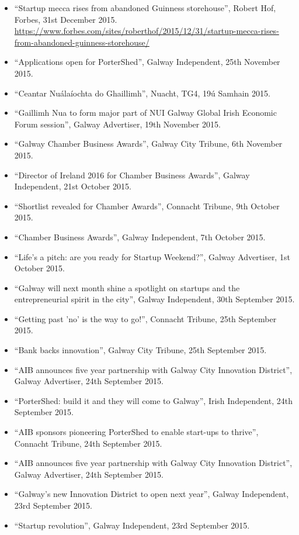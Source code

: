 \documentclass[10pt,a4paper]{res} %
\begin{document}
\begin{resume}
{\begin{itemize}
\item ``Startup mecca rises from abandoned Guinness storehouse'', Robert Hof, Forbes, 31st December 2015. \url{https://www.forbes.com/sites/roberthof/2015/12/31/startup-mecca-rises-from-abandoned-guinness-storehouse/}
\item ``Applications open for PorterShed'', Galway Independent, 25th November 2015.
\item ``Ceantar Nu\'{a}la\'{i}ochta do Ghaillimh'', Nuacht, TG4, 19\'{u} Samhain 2015.
\item ``Gaillimh Nua to form major part of NUI Galway Global Irish Economic Forum session'', Galway Advertiser, 19th November 2015.
\item ``Galway Chamber Business Awards'', Galway City Tribune, 6th November 2015.
\item ``Director of Ireland 2016 for Chamber Business Awards'', Galway Independent, 21st October 2015.
\item ``Shortlist revealed for Chamber Awards'', Connacht Tribune, 9th October 2015.
\item ``Chamber Business Awards'', Galway Independent, 7th October 2015.
\item ``Life's a pitch: are you ready for Startup Weekend?'', Galway Advertiser, 1st October 2015.
\item ``Galway will next month shine a spotlight on startups and the entrepreneurial spirit in the city'', Galway Independent, 30th September 2015.
\item ``Getting past 'no' is the way to go!'', Connacht Tribune, 25th September 2015.
\item ``Bank backs innovation'', Galway City Tribune, 25th September 2015.
\item ``AIB announces five year partnership with Galway City Innovation District'', Galway Advertiser, 24th September 2015.
\item ``PorterShed: build it and they will come to Galway'', Irish Independent, 24th September 2015.
\item ``AIB sponsors pioneering PorterShed to enable start-ups to thrive'', Connacht Tribune, 24th September 2015.
\item ``AIB announces five year partnership with Galway City Innovation District'', Galway Advertiser, 24th September 2015.
\item ``Galway's new Innovation District to open next year'', Galway Independent, 23rd September 2015.
\item ``Startup revolution'', Galway Independent, 23rd September 2015.

\end{itemize}}
\end{resume}
\end{document}
